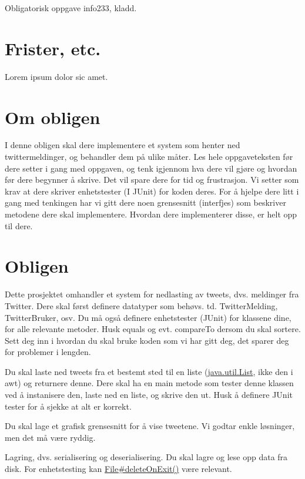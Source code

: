 \documentclass{article}
\begin{document}
Obligatorisk oppgave info233, kladd.

\section{Frister, etc.}
Lorem ipsum dolor sic amet.

\section{Om obligen}
I denne obligen skal dere implementere et system som henter ned twittermeldinger, og behandler dem på ulike måter.
Les hele oppgaveteksten før dere setter i gang med oppgaven, og tenk igjennom hva dere vil gjøre og hvordan før dere begynner å skrive.
Det vil spare dere for tid og frustrasjon.
Vi setter som krav at dere skriver enhetstester (I JUnit) for koden deres.
For å hjelpe dere litt i gang med tenkingen har vi gitt dere noen grensesnitt (interfjes) som beskriver metodene dere skal implementere.
Hvordan dere implementerer disse, er helt opp til dere.

\section{Obligen}

Dette prosjektet omhandler et system for nedlasting av tweets, dvs. meldinger fra Twitter. Dere skal først definere datatyper som behøvs. td. TwitterMelding, TwitterBruker, osv.
Du må også definere enhetstester (JUnit) for klassene dine, for alle relevante metoder. Husk equals og evt. compareTo dersom du skal sortere.
Sett deg inn i hvordan du skal bruke koden som vi har gitt deg, det sparer deg for problemer i lengden.

 
Du skal laste ned tweets fra et bestemt sted til en liste (\href{http://docs.oracle.com/javase/7/docs/api/java/util/List.html}{java.util.List}, ikke den i awt) og returnere denne. Dere skal ha en main metode som tester denne klassen ved å instanisere den, laste ned en liste, og skrive den ut.
Husk å definere JUnit tester for å sjekke at alt er korrekt.
 
Du skal lage et grafisk grensesnitt for å vise tweetene.
Vi godtar enkle løsninger, men det må være ryddig.
 
Lagring, dvs. serialisering og deserialisering.
Du skal lagre og lese opp data fra disk. For enhetstesting kan \href{http://docs.oracle.com/javase/7/docs/api/java/io/File.html#deleteOnExit\%28\%29}{File\#deleteOnExit()} være relevant.
    
\end{document}
